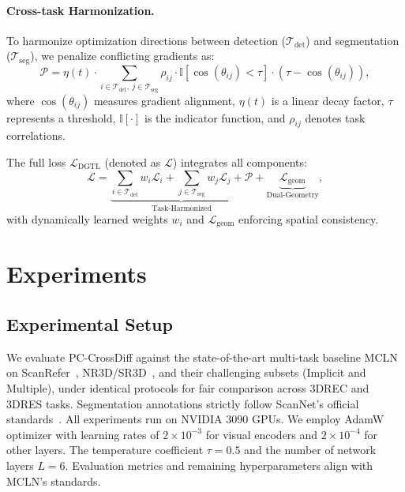 \documentclass[letterpaper]{article} %
\begin{document}
\paragraph{Cross-task Harmonization.}
To harmonize optimization directions between detection ($\mathcal{T}_{\text{det}}$) and segmentation ($\mathcal{T}_{\text{seg}}$), we penalize conflicting gradients as:
$$
\mathcal{P} = \eta(t) \cdot \sum_{i \in \mathcal{T}_{\text{det}},\ j \in \mathcal{T}_{\text{seg}}} \rho_{ij} \cdot \mathbb{I}\left[\cos(\theta_{ij}) < \tau\right] \cdot \left(\tau - \cos(\theta_{ij})\right),
$$
where $\cos(\theta_{ij})$ measures gradient alignment, $\eta(t)$ is a linear decay factor, $\tau$ represents a threshold, $\mathbb{I}[\cdot]$ is the indicator function, and $\rho_{ij}$ denotes task correlations. 

The full loss $\mathcal{L}_{\text{DGTL}}$ (denoted as $\mathcal{L}$) integrates all components:
\begin{equation}
	\mathcal{L} = 
	\underbrace{
		\sum_{i \in \mathcal{T}_{\text{det}}} w_i\mathcal{L}_i + 
		\sum_{j \in \mathcal{T}_{\text{seg}}} w_j\mathcal{L}_j + 
		\mathcal{P}
	}_{\text{Task-Harmonized}} 
	+ \underbrace{
		\mathcal{L}_{\text{geom}}
	}_{\text{Dual-Geometry}},
	\label{l_dgtl}
\end{equation}
with dynamically learned weights $w_i$ and $\mathcal{L}_{\text{geom}}$ enforcing spatial consistency.



\section{Experiments}



\subsection{Experimental Setup}


We evaluate PC-CrossDiff against the state-of-the-art multi-task baseline MCLN~\cite{qianMultibranchCollaborativeLearning2024} on ScanRefer~\cite{chenScanRefer3DObject2020a}, NR3D/SR3D~\cite{achlioptasReferIt3DNeuralListeners2020}, and their challenging subsets (Implicit and Multiple), under identical protocols for fair comparison across 3DREC and 3DRES tasks. Segmentation annotations strictly follow ScanNet's official standards~\cite{daiScanNetRichlyAnnotated3D2017}. All experiments run on NVIDIA 3090 GPUs. We employ AdamW optimizer with learning rates of $2\times10^{-3}$ for visual encoders and $2\times10^{-4}$ for other layers. The temperature coefficient $\tau = 0.5$ and the number of network layers $L = 6$. Evaluation metrics and remaining hyperparameters align with MCLN's standards.
\end{document}
